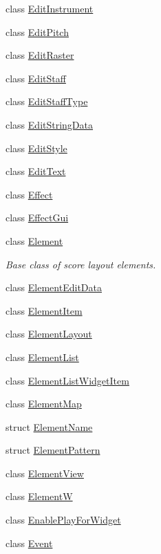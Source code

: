 \begin{DoxyCompactItemize}
class \hyperlink{class_ms_1_1_edit_instrument}{Edit\+Instrument}
\item 
class \hyperlink{class_ms_1_1_edit_pitch}{Edit\+Pitch}
\item 
class \hyperlink{class_ms_1_1_edit_raster}{Edit\+Raster}
\item 
class \hyperlink{class_ms_1_1_edit_staff}{Edit\+Staff}
\item 
class \hyperlink{class_ms_1_1_edit_staff_type}{Edit\+Staff\+Type}
\item 
class \hyperlink{class_ms_1_1_edit_string_data}{Edit\+String\+Data}
\item 
class \hyperlink{class_ms_1_1_edit_style}{Edit\+Style}
\item 
class \hyperlink{class_ms_1_1_edit_text}{Edit\+Text}
\item 
class \hyperlink{class_ms_1_1_effect}{Effect}
\item 
class \hyperlink{class_ms_1_1_effect_gui}{Effect\+Gui}
\item 
class \hyperlink{class_ms_1_1_element}{Element}
\begin{DoxyCompactList}\small\item\em Base class of score layout elements. \end{DoxyCompactList}\item 
class \hyperlink{class_ms_1_1_element_edit_data}{Element\+Edit\+Data}
\item 
class \hyperlink{class_ms_1_1_element_item}{Element\+Item}
\item 
class \hyperlink{class_ms_1_1_element_layout}{Element\+Layout}
\item 
class \hyperlink{class_ms_1_1_element_list}{Element\+List}
\item 
class \hyperlink{class_ms_1_1_element_list_widget_item}{Element\+List\+Widget\+Item}
\item 
class \hyperlink{class_ms_1_1_element_map}{Element\+Map}
\item 
struct \hyperlink{struct_ms_1_1_element_name}{Element\+Name}
\item 
struct \hyperlink{struct_ms_1_1_element_pattern}{Element\+Pattern}
\item 
class \hyperlink{class_ms_1_1_element_view}{Element\+View}
\item 
class \hyperlink{class_ms_1_1_element_w}{ElementW}
\item 
class \hyperlink{class_ms_1_1_enable_play_for_widget}{Enable\+Play\+For\+Widget}
\item 
class \hyperlink{class_ms_1_1_event}{Event}

\end{DoxyCompactItemize}
